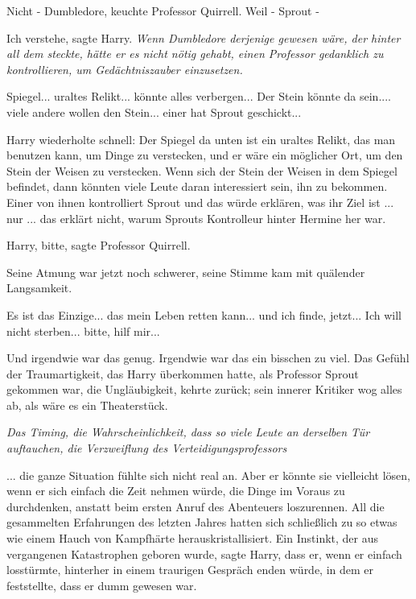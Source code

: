\glqq{}Nicht - Dumbledore\grqq{}, keuchte Professor Quirrell. \glqq{}Weil - Sprout
-\grqq{}

\glqq{}Ich verstehe\grqq{}, sagte Harry. \emph{Wenn Dumbledore derjenige gewesen
wäre, der hinter all dem steckte, hätte er es nicht nötig gehabt, einen
Professor gedanklich zu kontrollieren, um Gedächtniszauber einzusetzen.}

\glqq{}Spiegel... uraltes Relikt... könnte alles verbergen... Der Stein könnte da
sein.... viele andere wollen den Stein... einer hat Sprout geschickt...\grqq{}

Harry wiederholte schnell: \glqq{}Der Spiegel da unten ist ein uraltes Relikt,
das man benutzen kann, um Dinge zu verstecken, und er wäre ein möglicher Ort, um
den Stein der Weisen zu verstecken. Wenn sich der Stein der Weisen in dem
Spiegel befindet, dann könnten viele Leute daran interessiert sein, ihn zu
bekommen. Einer von ihnen kontrolliert Sprout und das würde erklären, was ihr
Ziel ist ... nur ... das erklärt nicht, warum Sprouts Kontrolleur hinter Hermine
her war.\grqq{}

\glqq{}Harry, bitte\grqq{}, sagte Professor Quirrell.

Seine Atmung war jetzt noch schwerer, seine Stimme kam mit quälender
Langsamkeit.

\glqq{}Es ist das Einzige... das mein Leben retten kann... und ich finde,
jetzt... Ich will nicht sterben... bitte, hilf mir...\grqq{}

Und irgendwie war das genug. Irgendwie war das ein bisschen zu viel. Das Gefühl
der Traumartigkeit, das Harry überkommen hatte, als Professor Sprout gekommen
war, die Ungläubigkeit, kehrte zurück; sein innerer Kritiker wog alles ab, als
wäre es ein Theaterstück.

\emph{Das Timing, die Wahrscheinlichkeit, dass so viele Leute an derselben Tür
auftauchen, die Verzweiflung des Verteidigungsprofessors}

... die ganze Situation fühlte sich nicht real an. Aber er könnte sie vielleicht
lösen, wenn er sich einfach die Zeit nehmen würde, die Dinge im Voraus zu
durchdenken, anstatt beim ersten Anruf des Abenteuers loszurennen. All die
gesammelten Erfahrungen des letzten Jahres hatten sich schließlich zu so etwas
wie einem Hauch von Kampfhärte herauskristallisiert. Ein Instinkt, der aus
vergangenen Katastrophen geboren wurde, sagte Harry, dass er, wenn er einfach
losstürmte, hinterher in einem traurigen Gespräch enden würde, in dem er
feststellte, dass er dumm gewesen war.

